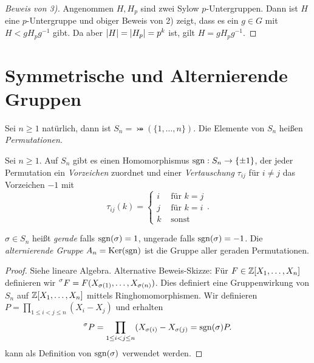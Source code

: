 \begin{proof}[Beweis von 3)]
	Angenommen $H, H_{p}$ sind zwei Sylow $p$-Untergruppen. Dann ist $H$ eine $p$-Untergruppe und obiger Beweis von 2) zeigt, dass es ein $g \in G$ mit
	$H < g H_{p} g^{-1}$ gibt. Da aber $\abs{H} = \abs{H_{p}} = p^{k}$ ist, gilt $H = g H_{p} g^{-1}$.
\end{proof}

\section{Symmetrische und Alternierende Gruppen}

\begin{definition}
	Sei $n \geq 1$ natürlich, dann ist $S_{n} = \bij(\{1,\ldots,n\})$.
	Die Elemente von $S_{n}$ heißen \emph{Permutationen}.
\end{definition}

\begin{theorem}
	Sei $n \geq 1$. Auf $S_{n}$ gibt es einen Homomorphismus $\operatorname{sgn}: S_{n} \to \{\pm 1\}$, der jeder Permutation ein \emph{Vorzeichen} zuordnet
	und einer \emph{Vertauschung} $\tau_{ij}$ für $i \neq j$ das Vorzeichen $-1$ mit
	\[
		\tau_{ij}(k) = \begin{cases}
			i &\text{ für } k = j\\
			j &\text{ für } k = i\\
			k &\text{ sonst}
		\end{cases}
	.\] 
\end{theorem}

\begin{definition}
	$\sigma \in S_{n}$ heißt \emph{gerade} falls $\operatorname{sgn}(\sigma) = 1$, ungerade falls $\operatorname{sgn}(\sigma) = -1$.
	Die \emph{alternierende Gruppe} $A_{n} = \operatorname{Ker}(\operatorname{sgn})$ ist die Gruppe aller geraden Permutationen.
\end{definition}

\begin{proof}
	Siehe lineare Algebra. Alternative Beweis-Skizze:
	Für $F \in \mathbb{Z}[X_1,\ldots,X_{n}]$ definieren wir $\prescript{\sigma}{}{F} = F(X_{\sigma(1)},\ldots, X_{\sigma(n)})$.
	Dies definiert eine Gruppenwirkung von $S_{n}$ auf $\mathbb{Z}[X_1,\ldots,X_{n}]$ mittels Ringhomomorphismen.
	Wir definieren $P = \prod_{1 \leq i < j \leq n} (X_{i} - X_{j})$ und erhalten
	\[
		\prescript{\sigma}{}{P} = \prod_{1 \leq i < j \leq n} (X_{\sigma(i)} - X_{\sigma(j)} = \operatorname{sgn}(\sigma) P
	.\] 
	kann als Definition von $\operatorname{sgn}(\sigma)$ verwendet werden.
\end{proof}

